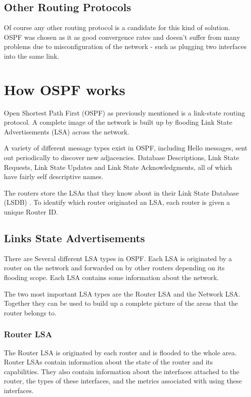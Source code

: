 \documentclass[12pt]{report}
\begin{document}
\subsection{Other Routing Protocols}
Of course any other routing protocol is a candidate for this kind of solution.
OSPF was chosen as it as good convergence rates and doesn't suffer from many
problems due to misconfiguration of the network - such as plugging two
interfaces into the same link.

\section{How OSPF works}
Open Shortest Path First (OSPF) as previously mentioned is a link-state routing
protocol. A complete image of the network is built up by flooding Link State
Advertisements (LSA) across the network. 

A variety of different message types exist in OSPF, including Hello messages,
sent out periodically to discover new adjacencies. Database Descriptions, Link
State Requests, Link State Updates and Link State Acknowledgments, all of which
have fairly self descriptive names.

The routers store the LSAs that they know about in their Link State Database
(LSDB) .  To identify which router
originated an LSA, each router is given a unique Router ID.

\subsection{Links State Advertisements}
There are Several different LSA types in OSPF\@. Each LSA is originated by
a router on the network and forwarded on by other routers depending on its
flooding scope. Each LSA contains some information about the network. 
 
The two most important LSA types are the Router LSA and the Network LSA\@.
Together they can be used to build up a complete picture of the areas that the
router belongs to. 

\subsubsection{Router LSA}
The Router LSA is originated by each router and is flooded to the whole area.
Router LSAs contain information about the state of the router and its
capabilities. They also contain information about the interfaces attached to
the router, the types of these interfaces, and the metrics associated with
using these interfaces. 
\end{document}
